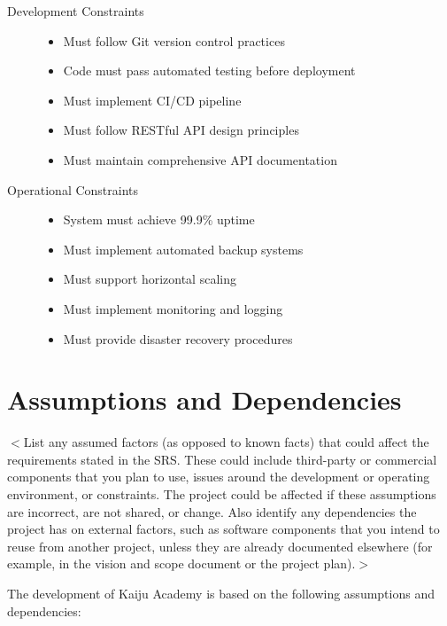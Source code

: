 \documentclass[a4paper, 11pt]{scrreprt}
\begin{document}
\begin{description}
    \item[Development Constraints]
        \begin{itemize}
            \item Must follow Git version control practices
            \item Code must pass automated testing before deployment
            \item Must implement CI/CD pipeline
            \item Must follow RESTful API design principles
            \item Must maintain comprehensive API documentation
        \end{itemize}
    
    \item[Operational Constraints]
        \begin{itemize}
            \item System must achieve 99.9\% uptime
            \item Must implement automated backup systems
            \item Must support horizontal scaling
            \item Must implement monitoring and logging
            \item Must provide disaster recovery procedures
        \end{itemize}
\end{description}

\section{Assumptions and Dependencies}
$<$List any assumed factors (as opposed to known facts) that could affect the 
requirements stated in the SRS. These could include third-party or commercial 
components that you plan to use, issues around the development or operating 
environment, or constraints. The project could be affected if these assumptions 
are incorrect, are not shared, or change. Also identify any dependencies the 
project has on external factors, such as software components that you intend to 
reuse from another project, unless they are already documented elsewhere (for 
example, in the vision and scope document or the project plan).$>$

The development of Kaiju Academy is based on the following assumptions and dependencies:
\end{document}
